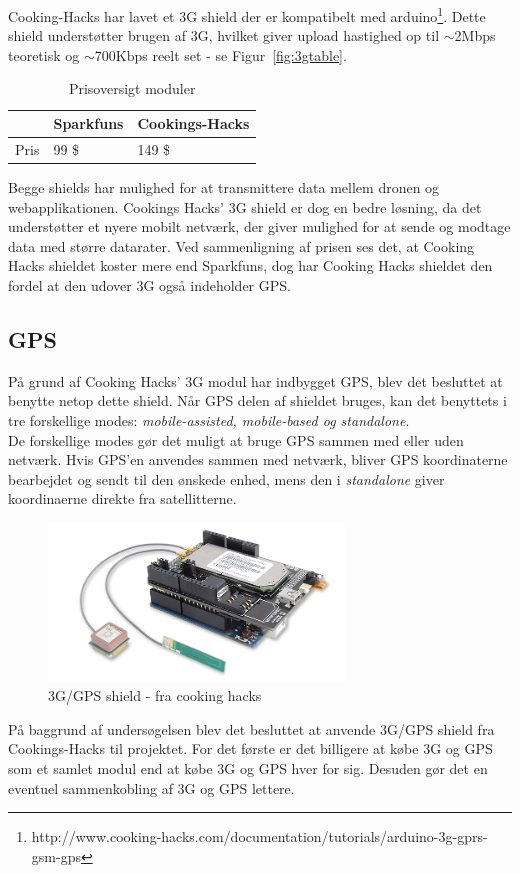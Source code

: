 Cooking-Hacks har lavet et 3G shield der er kompatibelt med arduino\footnote{http://www.cooking-hacks.com/documentation/tutorials/arduino-3g-gprs-gsm-gps}. Dette shield understøtter brugen af 3G, hvilket giver upload hastighed op til $\sim$2Mbps teoretisk og $\sim$700Kbps reelt set - se Figur~\ref{fig:3gtable}.

\begin{table}[H]
	\centering
		\begin{tabular}{|p{3.5cm}|p{5 cm}|p{5 cm}|} 
		\hline
			\textbf{ } & \textbf{Sparkfuns} 	& \textbf{Cookings-Hacks} \\ \hline
					Pris& 99 \$  & 149 \$ \\ \hline			 					 			
		\end{tabular}
	\caption{Prisoversigt moduler}
\end{table}

\newpage

Begge shields har mulighed for at transmittere data mellem dronen og webapplikationen. Cookings Hacks' 3G shield er dog en bedre løsning, da det understøtter et nyere mobilt netværk, der giver mulighed for at sende og modtage data med større datarater.
Ved sammenligning af prisen ses det, at Cooking Hacks shieldet koster mere end Sparkfuns, dog har Cooking Hacks shieldet den fordel at den udover 3G også indeholder GPS.

\subsection{GPS}
På grund af Cooking Hacks' 3G modul har indbygget GPS, blev det besluttet at benytte netop dette shield. Når GPS delen af shieldet bruges, kan det benyttets i tre forskellige modes: \textit{mobile-assisted, mobile-based og standalone}. \\
De forskellige modes gør det muligt at bruge GPS sammen med eller uden netværk. Hvis GPS'en anvendes sammen med netværk, bliver GPS koordinaterne bearbejdet og sendt til den ønskede enhed, mens den i \textit{standalone} giver koordinaerne direkte fra satellitterne.

\begin{figure}[H]
\centering
\includegraphics[width=0.7\textwidth]{Billeder/3G.png}
\caption{3G/GPS shield - fra cooking hacks}
\label{fig:3gshield}
\end{figure}


På baggrund af undersøgelsen blev det besluttet at anvende 3G/GPS shield fra Cookings-Hacks til projektet. For det første er det billigere at købe 3G og GPS som et samlet modul end at købe 3G og GPS hver for sig. Desuden gør det en eventuel sammenkobling af 3G og GPS lettere.











